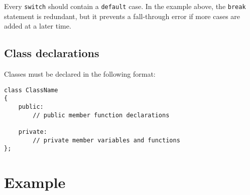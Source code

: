 \documentclass{article}
\newcommand{\code}[1]{\texttt{\colorbox{gray!30}{#1}}}
\begin{document}
Every \code{switch} should contain a \code{default} case.
In the example above, the \code{break} statement is redundant, but it prevents a fall-through error if more cases are added at a later time.

\subsection{Class declarations}
Classes must be declared in the following format:
\begin{lstlisting}
class ClassName
{
	public:
		// public member function declarations

	private:
		// private member variables and functions
};
\end{lstlisting}

\section*{Example}
\end{document}
